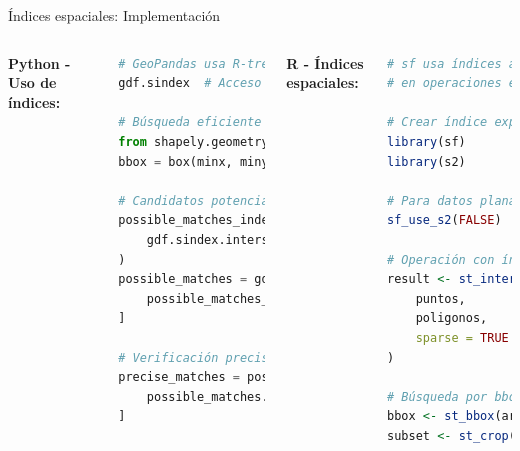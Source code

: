\documentclass[10pt,aspectratio=169]{beamer}
\begin{document}
\begin{frame}[fragile]{Índices espaciales: Implementación}
    \begin{columns}[T]
        \textbf{Python - Uso de índices:}
        \begin{lstlisting}[language=Python]
# GeoPandas usa R-tree automáticamente
gdf.sindex  # Acceso al índice

# Búsqueda eficiente
from shapely.geometry import box
bbox = box(minx, miny, maxx, maxy)

# Candidatos potenciales
possible_matches_index = list(
    gdf.sindex.intersection(bbox.bounds)
)
possible_matches = gdf.iloc[
    possible_matches_index
]

# Verificación precisa
precise_matches = possible_matches[
    possible_matches.intersects(bbox)
]
        \end{lstlisting}
        
        \textbf{R - Índices espaciales:}
        \begin{lstlisting}[language=R]
# sf usa índices automáticamente
# en operaciones espaciales

# Crear índice explícito
library(sf)
library(s2)

# Para datos planares
sf_use_s2(FALSE)

# Operación con índice
result <- st_intersects(
    puntos, 
    poligonos,
    sparse = TRUE  # matriz sparse
)

# Búsqueda por bbox
bbox <- st_bbox(area_interes)
subset <- st_crop(gdf, bbox)
        \end{lstlisting}
    \end{columns}
\end{frame}
\end{document}
